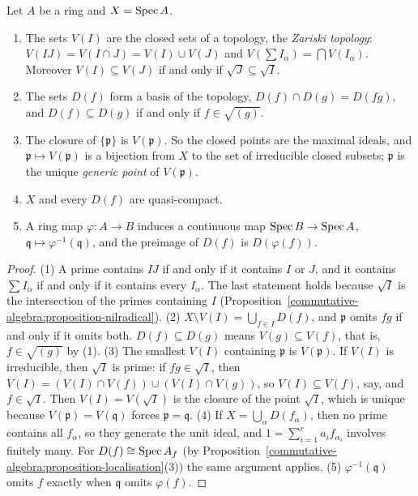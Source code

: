 \begin{proposition}\label{schemes:proposition-spec-topology}
Let $A$ be a ring and $X = \operatorname{Spec} A$.
\begin{enumerate}
\item The sets $V(I)$ are the closed sets of a topology, the \emph{Zariski topology}: $V(IJ) = V(I \cap J) = V(I) \cup V(J)$ and
$V(\sum I_\alpha) = \bigcap V(I_\alpha)$. Moreover $V(I) \subseteq V(J)$ if and only if $\sqrt J \subseteq \sqrt I$.
\item The sets $D(f)$ form a basis of the topology, $D(f) \cap D(g) = D(fg)$, and $D(f) \subseteq D(g)$ if and only if $f \in \sqrt{(g)}$.
\item The closure of $\{\mathfrak{p}\}$ is $V(\mathfrak{p})$. So the closed points are the maximal ideals, and $\mathfrak{p} \mapsto V(\mathfrak{p})$ is a bijection
from $X$ to the set of irreducible closed subsets; $\mathfrak{p}$ is the unique \emph{generic point} of $V(\mathfrak{p})$.
\item $X$ and every $D(f)$ are quasi-compact.
\item A ring map $\varphi \colon A \to B$ induces a continuous map $\operatorname{Spec} B \to \operatorname{Spec} A$, $\mathfrak{q} \mapsto \varphi^{-1}(\mathfrak{q})$, and the preimage
of $D(f)$ is $D(\varphi(f))$.
\end{enumerate}
\end{proposition}

\begin{proof}
(1) A prime contains $IJ$ if and only if it contains $I$ or $J$, and it contains $\sum I_\alpha$ if and only if it contains every $I_\alpha$. The last
statement holds because $\sqrt I$ is the intersection of the primes containing $I$
(Proposition~\ref{commutative-algebra:proposition-nilradical}). (2) $X \setminus V(I) = \bigcup_{f \in I}D(f)$, and $\mathfrak{p}$ omits $fg$ if and
only if it omits both. $D(f) \subseteq D(g)$ means $V(g) \subseteq V(f)$, that is, $f \in \sqrt{(g)}$ by (1). (3) The smallest $V(I)$ containing
$\mathfrak{p}$ is $V(\mathfrak{p})$. If $V(I)$ is irreducible, then $\sqrt I$ is prime: if $fg \in \sqrt I$, then $V(I) = (V(I) \cap V(f)) \cup (V(I) \cap V(g))$,
so $V(I) \subseteq V(f)$, say, and $f \in \sqrt I$. Then $V(I) = V(\sqrt I)$ is the closure of the point $\sqrt I$, which is unique because
$V(\mathfrak{p}) = V(\mathfrak{q})$ forces $\mathfrak{p} = \mathfrak{q}$. (4) If $X = \bigcup_\alpha D(f_\alpha)$, then no prime contains all $f_\alpha$, so they
generate the unit ideal, and $1 = \sum_{i=1}^ra_if_{\alpha_i}$ involves finitely many. For $D(f) \cong \operatorname{Spec} A_f$ (by
Proposition~\ref{commutative-algebra:proposition-localisation}(3)) the same argument applies. (5) $\varphi^{-1}(\mathfrak{q})$ omits $f$ exactly when
$\mathfrak{q}$ omits $\varphi(f)$.
\end{proof}

